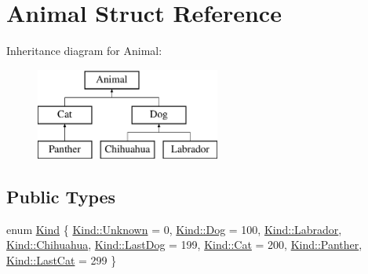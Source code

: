 \hypertarget{struct_animal}{}\section{Animal Struct Reference}
\label{struct_animal}
Inheritance diagram for Animal\+:\begin{figure}[H]
\begin{center}
\leavevmode
\includegraphics[height=3.000000cm]{struct_animal}
\end{center}
\end{figure}
\subsection*{Public Types}
\begin{DoxyCompactItemize}
\item 
enum \mbox{\hyperlink{struct_animal_abd6bed3bf6361cc3dc37c03f297e3f48}{Kind}} \{ \newline
\mbox{\hyperlink{struct_animal_abd6bed3bf6361cc3dc37c03f297e3f48a88183b946cc5f0e8c96b2e66e1c74a7e}{Kind\+::\+Unknown}} = 0, 
\mbox{\hyperlink{struct_animal_abd6bed3bf6361cc3dc37c03f297e3f48ac935d187f0b998ef720390f85014ed1e}{Kind\+::\+Dog}} = 100, 
\mbox{\hyperlink{struct_animal_abd6bed3bf6361cc3dc37c03f297e3f48a64e6aeaee5fb88b89c566f93d4e3e20d}{Kind\+::\+Labrador}}, 
\mbox{\hyperlink{struct_animal_abd6bed3bf6361cc3dc37c03f297e3f48a4ab02eb42d91b8e97216863c820a553b}{Kind\+::\+Chihuahua}}, 
\newline
\mbox{\hyperlink{struct_animal_abd6bed3bf6361cc3dc37c03f297e3f48aeeb68e4663b444c12faea6ec1f3a1bab}{Kind\+::\+Last\+Dog}} = 199, 
\mbox{\hyperlink{struct_animal_abd6bed3bf6361cc3dc37c03f297e3f48afa3ebd6742c360b2d9652b7f78d9bd7d}{Kind\+::\+Cat}} = 200, 
\mbox{\hyperlink{struct_animal_abd6bed3bf6361cc3dc37c03f297e3f48abcd8d4056b12fd3e0b2eea181eeb0123}{Kind\+::\+Panther}}, 
\mbox{\hyperlink{struct_animal_abd6bed3bf6361cc3dc37c03f297e3f48a62b19a66718d4f968c685feed59d4797}{Kind\+::\+Last\+Cat}} = 299
 \}
\end{DoxyCompactItemize}
